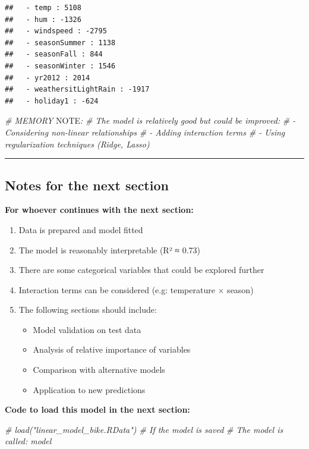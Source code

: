\documentclass[
]{article}
\newenvironment{Shaded}{\begin{snugshade}}{\end{snugshade}}
\newcommand{\AlertTok}[1]{\textcolor[rgb]{0.94,0.16,0.16}{#1}}
\newcommand{\CommentTok}[1]{\textcolor[rgb]{0.56,0.35,0.01}{\textit{#1}}}
\providecommand{\tightlist}{%
  \setlength{\itemsep}{0pt}\setlength{\parskip}{0pt}}
\begin{document}
\begin{verbatim}
##   - temp : 5108 
##   - hum : -1326 
##   - windspeed : -2795 
##   - seasonSummer : 1138 
##   - seasonFall : 844 
##   - seasonWinter : 1546 
##   - yr2012 : 2014 
##   - weathersitLightRain : -1917 
##   - holiday1 : -624
\end{verbatim}

\begin{Shaded}
\begin{Highlighting}[]
\CommentTok{\# MEMORY }\AlertTok{NOTE}\CommentTok{:}
\CommentTok{\# The model is relatively good but could be improved:}
\CommentTok{\# {-} Considering non{-}linear relationships}
\CommentTok{\# {-} Adding interaction terms}
\CommentTok{\# {-} Using regularization techniques (Ridge, Lasso)}
\end{Highlighting}
\end{Shaded}

\begin{center}\rule{0.5\linewidth}{0.5pt}\end{center}

\subsection{Notes for the next
section}\label{notes-for-the-next-section}

\textbf{For whoever continues with the next section:}

\begin{enumerate}
\def\labelenumi{\arabic{enumi}.}
\tightlist
\item
  Data is prepared and model fitted
\item
  The model is reasonably interpretable (R² ≈ 0.73)
\item
  There are some categorical variables that could be explored further
\item
  Interaction terms can be considered (e.g: temperature × season)
\item
  The following sections should include:

  \begin{itemize}
  \tightlist
  \item
    Model validation on test data
  \item
    Analysis of relative importance of variables
  \item
    Comparison with alternative models
  \item
    Application to new predictions
  \end{itemize}
\end{enumerate}

\textbf{Code to load this model in the next section:}

\begin{Shaded}
\begin{Highlighting}[]
\CommentTok{\# load("linear\_model\_bike.RData")  \# If the model is saved}
\CommentTok{\# The model is called: model}
\end{Highlighting}
\end{Shaded}
\end{document}
